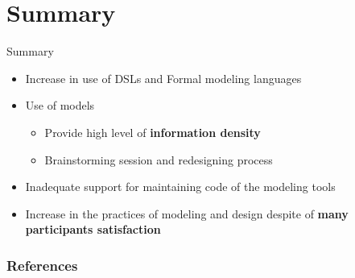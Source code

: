 \documentclass[slidetop,mathserif,red]{beamer}
\begin{document}

\section{Summary}
\begin{frame}{Summary}
    \begin{itemize}
   \item Increase in use of DSLs and Formal modeling languages
   \item Use of models
   \begin{itemize}
   	\item Provide high level of \textbf{information density}
   	\item Brainstorming session and redesigning process
   \end{itemize}
	\item Inadequate support for maintaining code of the modeling tools
    \item Increase in the practices of modeling and design despite of \textbf{many participants satisfaction}
    \end{itemize}
\end{frame}


\begin{frame}[allowframebreaks]
\frametitle{References}


\end{frame}



\end{document}
